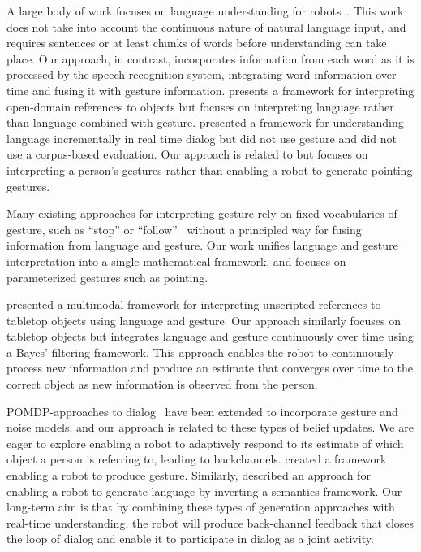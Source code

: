 \documentclass[letterpaper, 10 pt, conference]{ieeeconf}
\begin{document}
A large body of work focuses on language understanding for
robots~\citep{macmahon06, dzifcak09, kollar10, matuszek12}.  This work
does not take into account the continuous nature of natural language
input, and requires sentences or at least chunks of words before
understanding can take place.  Our approach, in contrast, incorporates
information from each word as it is processed by the speech
recognition system, integrating word information over time and fusing
it with gesture information.  \citet{guadarrama14} presents a
framework for interpreting open-domain references to objects but
focuses on interpreting language rather than language combined with
gesture.  \citet{cantrell10} presented a framework for understanding
language incrementally in real time dialog but did not use gesture and
did not use a corpus-based evaluation.  Our approach is related to
\citet{holladay14} but focuses on interpreting a person's gestures
rather than enabling a robot to generate pointing gestures.

Many existing approaches for interpreting gesture rely on fixed
vocabularies of gesture, such as ``stop'' or
``follow''~\citep{waldherr00, marge11} without a principled way for
fusing information from language and gesture.  Our work unifies
language and gesture interpretation into a single mathematical
framework, and focuses on parameterized gestures such as pointing.






\citet{matuszek14} presented a multimodal framework for interpreting
unscripted references to tabletop objects using language and gesture.
Our approach similarly focuses on tabletop objects but integrates
language and gesture continuously over time using a Bayes' filtering
framework.  This approach enables the robot to continuously process
new information and produce an estimate that converges over time to
the correct object as new information is observed from the person.

POMDP-approaches to dialog~\citep{young13, young10} have been extended
to incorporate gesture and noise models, and our approach is related
to these types of belief updates.  We are eager to explore enabling a
robot to adaptively respond to its estimate of which object a person
is referring to, leading to backchannels.  \citet{dragan13} created a
framework enabling a robot to produce gesture.  Similarly,
\citet{tellex14} described an approach for enabling a robot to
generate language by inverting a semantics framework.  Our long-term
aim is that by combining these types of generation approaches with
real-time understanding, the robot will produce back-channel feedback
that closes the loop of dialog and enable it to participate in dialog
as a joint activity.
\end{document}
